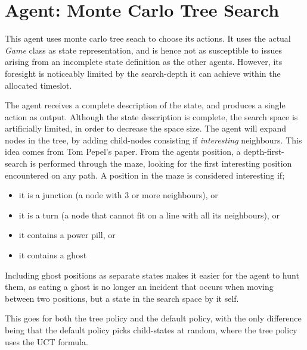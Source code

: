 \section{Agent: Monte Carlo Tree Search}
\label{sec:mcts}

This agent uses monte carlo tree seach to choose its actions. It uses the
actual \textit{Game} class as state representation, and is hence not as
susceptible to issues arising from an incomplete state definition as the other
agents. However, its foresight is noticeably limited by the search-depth it can
achieve within the allocated timeslot.

The agent receives a complete description of the state, and produces a single
action as output. Although the state description is complete, the search space
is artificially limited, in order to decrease the space size. The agent will
expand nodes in the tree, by adding child-nodes consisting if
\textit{interesting} neighbours. This idea comes from Tom Pepel's
paper\cite{tompepels}. From the agents position, a depth-first-search is
performed through the maze, looking for the first interesting position
encountered on any path. A position in the maze is considered interesting if;
\begin{itemize}
	\item it is a junction (a node with 3 or more neighbours), or
	\item it is a turn (a node that cannot fit on a line with all its neighbours), or
	\item it contains a power pill, or
	\item it contains a ghost
\end{itemize}

Including ghost positions as separate states makes it easier for the agent to
hunt them, as eating a ghost is no longer an incident that occurs when moving
between two positions, but a state in the search space by it self.

This goes for both the tree policy and the default policy, with the only
difference being that the default policy picks child-states at random, where the
tree policy uses the UCT formula.

